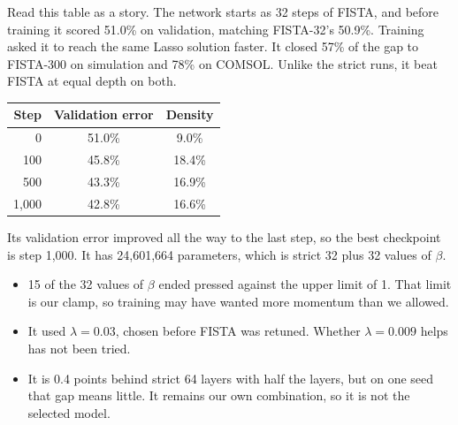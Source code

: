 Read this table as a story. The network starts as 32 steps of FISTA, and before training it scored 51.0\% on validation,
matching FISTA-32's 50.9\%. Training asked it to reach the same Lasso solution faster. It closed 57\% of the gap to
FISTA-300 on simulation and 78\% on COMSOL. Unlike the strict runs, it beat FISTA at equal depth on both.

\begin{center}
\begin{tabular}{rcc}
\toprule
Step & Validation error & Density \\
\midrule
0 & 51.0\% & 9.0\% \\
100 & 45.8\% & 18.4\% \\
500 & 43.3\% & 16.9\% \\
1,000 & 42.8\% & 16.6\% \\
\bottomrule
\end{tabular}
\end{center}

Its validation error improved all the way to the last step, so the best checkpoint is step 1,000. It has 24,601,664
parameters, which is strict 32 plus 32 values of $\beta$.

\begin{careful}
\begin{itemize}
\item 15 of the 32 values of $\beta$ ended pressed against the upper limit of 1. That limit is our clamp, so training
may have wanted more momentum than we allowed.
\item It used $\lambda=0.03$, chosen before FISTA was retuned. Whether $\lambda=0.009$ helps has not been tried.
\item It is 0.4 points behind strict 64 layers with half the layers, but on one seed that gap means little. It remains our
own combination, so it is not the selected model.
\end{itemize}
\end{careful}
